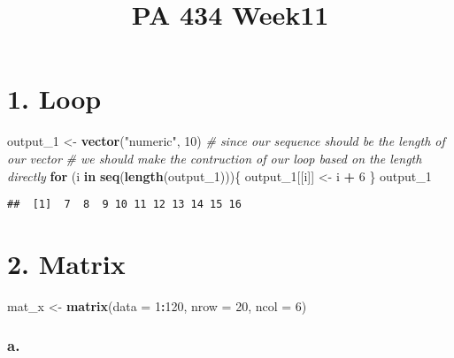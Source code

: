 \documentclass[]{article}
\title{PA 434 Week11}
\author{}
\date{\vspace{-2.5em}}
\newenvironment{Shaded}{\begin{snugshade}}{\end{snugshade}}
\newcommand{\CommentTok}[1]{\textcolor[rgb]{0.56,0.35,0.01}{\textit{#1}}}
\newcommand{\ControlFlowTok}[1]{\textcolor[rgb]{0.13,0.29,0.53}{\textbf{#1}}}
\newcommand{\DataTypeTok}[1]{\textcolor[rgb]{0.13,0.29,0.53}{#1}}
\newcommand{\DecValTok}[1]{\textcolor[rgb]{0.00,0.00,0.81}{#1}}
\newcommand{\KeywordTok}[1]{\textcolor[rgb]{0.13,0.29,0.53}{\textbf{#1}}}
\newcommand{\NormalTok}[1]{#1}
\newcommand{\OperatorTok}[1]{\textcolor[rgb]{0.81,0.36,0.00}{\textbf{#1}}}
\newcommand{\StringTok}[1]{\textcolor[rgb]{0.31,0.60,0.02}{#1}}
\begin{document}
\maketitle

\hypertarget{loop}{%
\section{1. Loop}\label{loop}}

\begin{Shaded}
\begin{Highlighting}[]
\NormalTok{output_}\DecValTok{1}\NormalTok{ <-}\StringTok{ }\KeywordTok{vector}\NormalTok{(}\StringTok{"numeric"}\NormalTok{, }\DecValTok{10}\NormalTok{)}
\CommentTok{# since our sequence should be the length of our vector}
\CommentTok{# we should make the contruction of our loop based on the length directly}
\ControlFlowTok{for}\NormalTok{ (i }\ControlFlowTok{in} \KeywordTok{seq}\NormalTok{(}\KeywordTok{length}\NormalTok{(output_}\DecValTok{1}\NormalTok{)))\{}
\NormalTok{  output_}\DecValTok{1}\NormalTok{[[i]] <-}\StringTok{ }\NormalTok{i }\OperatorTok{+}\StringTok{ }\DecValTok{6}
\NormalTok{\}}
\NormalTok{output_}\DecValTok{1}
\end{Highlighting}
\end{Shaded}

\begin{verbatim}
##  [1]  7  8  9 10 11 12 13 14 15 16
\end{verbatim}

\hypertarget{matrix}{%
\section{2. Matrix}\label{matrix}}

\begin{Shaded}
\begin{Highlighting}[]
\NormalTok{mat_x <-}\StringTok{ }\KeywordTok{matrix}\NormalTok{(}\DataTypeTok{data =} \DecValTok{1}\OperatorTok{:}\DecValTok{120}\NormalTok{, }\DataTypeTok{nrow =} \DecValTok{20}\NormalTok{, }\DataTypeTok{ncol =} \DecValTok{6}\NormalTok{)}
\end{Highlighting}
\end{Shaded}

\hypertarget{a.}{%
\subsubsection{a.}\label{a.}}
\end{document}
